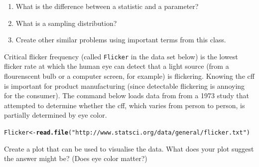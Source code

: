 \documentclass[twoside]{book}\usepackage[]{graphicx}\usepackage[]{xcolor}
\makeatletter
\newcommand{\hlstr}[1]{\textcolor[rgb]{0.192,0.494,0.8}{#1}}%
\newcommand{\hlstd}[1]{\textcolor[rgb]{0.345,0.345,0.345}{#1}}%
\newcommand{\hlkwb}[1]{\textcolor[rgb]{0.69,0.353,0.396}{#1}}%
\newcommand{\hlkwd}[1]{\textcolor[rgb]{0.737,0.353,0.396}{\textbf{#1}}}%
\newenvironment{kframe}{%
 \def\at@end@of@kframe{}%
 \ifinner\ifhmode%
  \def\at@end@of@kframe{\end{minipage}}%
  \begin{minipage}{\columnwidth}%
 \fi\fi%
 \def\FrameCommand##1{\hskip\@totalleftmargin \hskip-\fboxsep
 \colorbox{shadecolor}{##1}\hskip-\fboxsep
     \hskip-\linewidth \hskip-\@totalleftmargin \hskip\columnwidth}%
 \MakeFramed {\advance\hsize-\width
   \@totalleftmargin\z@ \linewidth\hsize
   \@setminipage}}%
 {\par\unskip\endMakeFramed%
 \at@end@of@kframe}
\newenvironment{knitrout}{}{} %
\newcommand{\variable}[1]{{\color{green!50!black}\texttt{#1}}}
\newcounter{example}[section]
\makeatother
\begin{document}
\begin{solution}
\begin{knitrout}
\begin{kframe}
{\ttfamily\noindent\bfseries\color{errorcolor}{\#\# Error in gf\_ingredients(formula = gformula, data = data, gg\_object = object, : object 'StudentSurvey2' not found}}\end{kframe}
\end{knitrout}
\end{solution}
\fi

\begin{problem}
	\begin{enumerate}
		\item
			What is the difference between a statistic and a parameter?
		\item
			What is a sampling distribution?
		\item
			Create other similar problems using important terms from this class.
	\end{enumerate}
\end{problem}


\begin{problem}
Critical flicker frequency (called \variable{Flicker} in the data set below) is the 
lowest flicker rate at which the human eye
can detect that a light source (from a flourenscent bulb or a computer screen, for example)
is flickering.  Knowing the cff is important for product manufacturing (since detectable
flickering is annoying for the consumer).  The command below loads data from 
from a 1973 study that attempted to determine whether the cff, which varies 
from person to person, is partially determined by eye color.  
\begin{knitrout}
\color{fgcolor}\begin{kframe}
\begin{alltt}
\hlstd{Flicker} \hlkwb{<-} \hlkwd{read.file}\hlstd{(}\hlstr{"http://www.statsci.org/data/general/flicker.txt"}\hlstd{)}
\end{alltt}


{\ttfamily\noindent\itshape\color{messagecolor}{\#\# Reading data with read.table()}}\end{kframe}
\end{knitrout}

Create a plot that can be used to visualise the data.  What does your plot suggest
the answer might be? (Does eye color matter?)
\end{problem}
\end{document}
